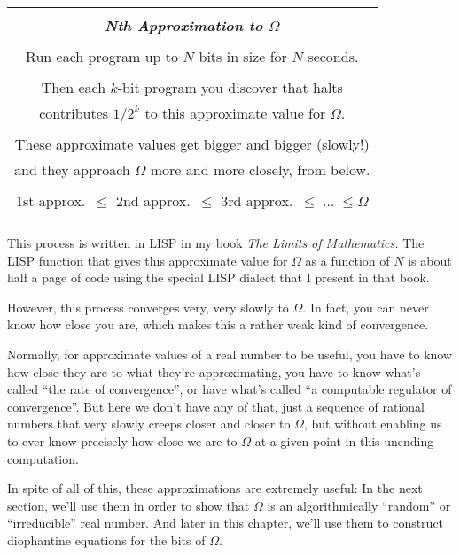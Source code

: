 \documentclass[12pt]{book}
\begin{document}
\begin{center}
\begin{tabular}{|c|}
\hline
\\
\textbf{\large \emph{Nth Approximation to $\Omega$}}
\\ \\
Run each program up to $N$ bits in size for $N$ seconds.
\\ \\
Then each $k$-bit program you discover that halts   
\\
contributes $1/2^k$ to this approximate value for $\Omega$.
\\ \\
These approximate values get bigger and bigger (slowly!)
\\
and they approach $\Omega$ 
more and more closely, from below.
\\ \\
1st approx.\ $\leq$ 2nd approx.\ $\leq$ 3rd approx.\ $\leq \; \ldots \; \leq \Omega$
\\
\\
\hline
\end{tabular}
\end{center}
 
This process is written in LISP in my book \emph{The Limits of Mathematics.}
The LISP function that gives this approximate value for $\Omega$ as a function of $N$
is about half a page of code using the special LISP dialect that I present in that book.
 
However, this process converges very, very slowly to $\Omega$. In fact, you can never
know how close you are, which makes this a rather weak kind of convergence.  
 
Normally, for approximate values of a real number to be useful, you have to know how
close they are to what they're approximating, you have to know what's called ``the rate
of convergence'', or have what's called ``a computable regulator of convergence''.  But here
we don't have any of that, just a sequence of rational numbers that very slowly creeps
closer and closer to $\Omega$, but without enabling us to ever know precisely how close we are 
to $\Omega$ at a given point in this unending computation.
 
In spite of all of this,
these approximations are extremely useful:
In the next section,
we'll use them in order to show that $\Omega$ is an algorithmically
``random'' or ``irreducible'' real number.
And later in this chapter,
we'll use them to construct diophantine equations for the bits of $\Omega$.
\end{document}
